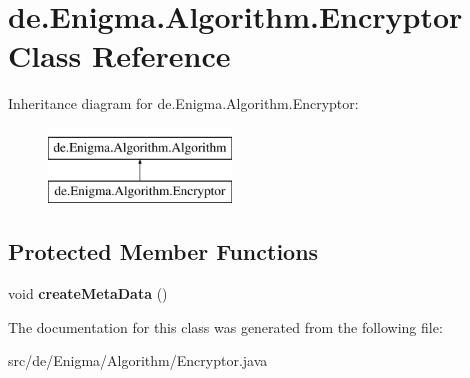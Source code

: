 \hypertarget{classde_1_1_enigma_1_1_algorithm_1_1_encryptor}{}\section{de.\+Enigma.\+Algorithm.\+Encryptor Class Reference}
\label{classde_1_1_enigma_1_1_algorithm_1_1_encryptor}
Inheritance diagram for de.\+Enigma.\+Algorithm.\+Encryptor\+:\begin{figure}[H]
\begin{center}
\leavevmode
\includegraphics[height=2.000000cm]{classde_1_1_enigma_1_1_algorithm_1_1_encryptor}
\end{center}
\end{figure}
\subsection*{Protected Member Functions}
\begin{DoxyCompactItemize}
\item 
\mbox{\label{classde_1_1_enigma_1_1_algorithm_1_1_encryptor_a8372de0c96311b2fce4d79c4df2b0cda}} 
void {\bfseries create\+Meta\+Data} ()
\end{DoxyCompactItemize}


The documentation for this class was generated from the following file\+:\begin{DoxyCompactItemize}
\item 
src/de/\+Enigma/\+Algorithm/Encryptor.\+java\end{DoxyCompactItemize}
